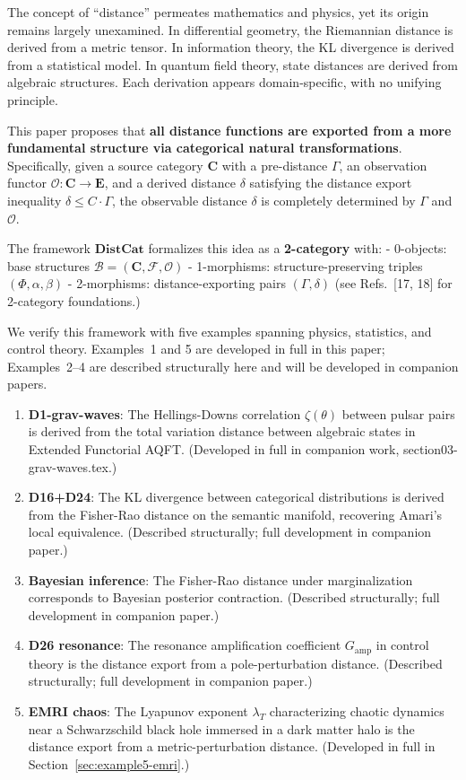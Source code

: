 \documentclass[
]{article}
\providecommand{\tightlist}{%
  \setlength{\itemsep}{0pt}\setlength{\parskip}{0pt}}
\begin{document}
The concept of ``distance'' permeates mathematics and physics, yet its
origin remains largely unexamined. In differential geometry, the
Riemannian distance is derived from a metric tensor. In information
theory, the KL divergence is derived from a statistical model. In
quantum field theory, state distances are derived from algebraic
structures. Each derivation appears domain-specific, with no unifying
principle.

This paper proposes that \textbf{all distance functions are exported
from a more fundamental structure via categorical natural
transformations}. Specifically, given a source category \(\mathbf{C}\)
with a pre-distance \(\Gamma\), an observation functor
\(\mathcal{O}: \mathbf{C} \to \mathbf{E}\), and a derived distance
\(\delta\) satisfying the distance export inequality \(\delta \leq C \cdot \Gamma\),
the observable distance \(\delta\)
is completely determined by \(\Gamma\) and \(\mathcal{O}\).

The framework \(\mathbf{DistCat}\) formalizes this idea as a
\textbf{2-category} with: - 0-objects: base structures
\(\mathcal{B} = (\mathbf{C}, \mathcal{F}, \mathcal{O})\) - 1-morphisms:
structure-preserving triples \((\Phi, \alpha, \beta)\) - 2-morphisms:
distance-exporting pairs \((\Gamma, \delta)\) (see
Refs.~[17, 18] for 2-category foundations.)

We verify this framework with five examples spanning physics,
statistics, and control theory. Examples~1 and 5 are developed in full
in this paper; Examples~2--4 are described structurally here and will be
developed in companion papers.

\begin{enumerate}
\def\labelenumi{\arabic{enumi}.}
\tightlist
\item
  \textbf{D1-grav-waves}: The Hellings-Downs correlation
  \(\zeta(\theta)\) between pulsar pairs is derived from the total
  variation distance between algebraic states in Extended Functorial
  AQFT. (Developed in full in companion work, section03-grav-waves.tex.)
\item
  \textbf{D16+D24}: The KL divergence between categorical distributions
  is derived from the Fisher-Rao distance on the semantic manifold,
  recovering Amari's local equivalence. (Described structurally; full
  development in companion paper.)
\item
  \textbf{Bayesian inference}: The Fisher-Rao distance under
  marginalization corresponds to Bayesian posterior contraction.
  (Described structurally; full development in companion paper.)
\item
  \textbf{D26 resonance}: The resonance amplification coefficient
  \(G_{\text{amp}}\) in control theory is the distance export from a
  pole-perturbation distance. (Described structurally; full
  development in companion paper.)
\item
  \textbf{EMRI chaos}: The Lyapunov exponent \(\lambda_T\)
  characterizing chaotic dynamics near a Schwarzschild black hole
  immersed in a dark matter halo is the distance export from a
  metric-perturbation distance. (Developed in full in Section~\ref{sec:example5-emri}.)
\end{enumerate}
\end{document}
